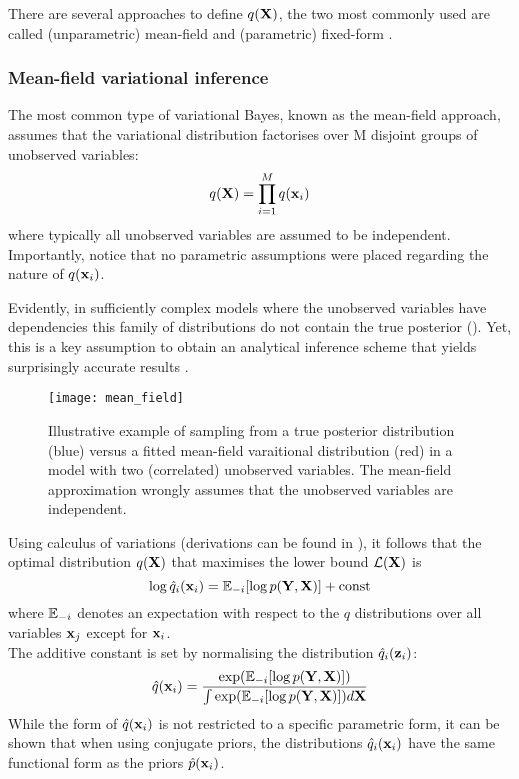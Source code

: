 There are several approaches to define $q({\bf X})$, the two most commonly used are called (unparametric) mean-field and (parametric) fixed-form \cite{Zhang2017,Blei2016}.

\subsubsection{Mean-field variational inference}  \label{section:mean_field}

The most common type of variational Bayes, known as the mean-field approach, assumes that the variational distribution factorises over M disjoint groups of unobserved variables\cite{Saul1996}:
\begin{equation} \label{eq:mean_field}
	q({\bf X}) = \prod_{i=1}^{M} q({\bf x}_i)
\end{equation}
where typically all unobserved variables are assumed to be independent. Importantly, notice that no parametric assumptions were placed regarding the nature of $q({\bf x}_i)$.

Evidently, in sufficiently complex models where the unobserved variables have dependencies this family of distributions do not contain the true posterior (). Yet, this is a key assumption to obtain an analytical inference scheme that yields surprisingly accurate results \cite{Blei2006,Faes2011,Braun2007}.

\begin{figure}[H]
	\centering
	\texttt{[image: mean\_field]}
	\caption{Illustrative example of sampling from a true posterior distribution (blue) versus a fitted mean-field varaitional distribution (red) in a model with two (correlated) unobserved variables. The mean-field approximation wrongly assumes that the unobserved variables are independent.}
	\label{fig:mean_field}
\end{figure}

Using calculus of variations (derivations can be found in \cite{Bishop2006,Murphy}), it follows that the optimal distribution $q({\bf X})$ that maximises the lower bound $\mathcal{L}({\bf X})$ is
\begin{equation} \label{eq:optimal}
	\log \hat{q}_i({\bf x}_i) = \mathbb{E}_{-i} [\log p({\bf Y},{\bf X})] + \mathrm{const}
\end{equation}
where $\mathbb{E}_{-i}$ denotes an expectation with respect to the $q$ distributions over all variables ${\bf x}_j$ except for ${\bf x}_i$.\\
The additive constant is set by normalising the distribution $\hat{q}_i({\bf z}_i)$:
\[
	\hat{q}({\bf x}_i) = \frac{\exp(\mathbb{E}_{-i}[\log p({\bf Y},{\bf X})])}{\int \exp(\mathbb{E}_{-i}[\log p({\bf Y},{\bf X})]) d{\bf X}}
\]
While the form of $\hat{q}({\bf x}_i)$ is not restricted to a specific parametric form, it can be shown that when using conjugate priors, the distributions $\hat{q}_i({\bf x}_i)$ have the same functional form as the priors $\hat{p}({\bf x}_i)$. 


